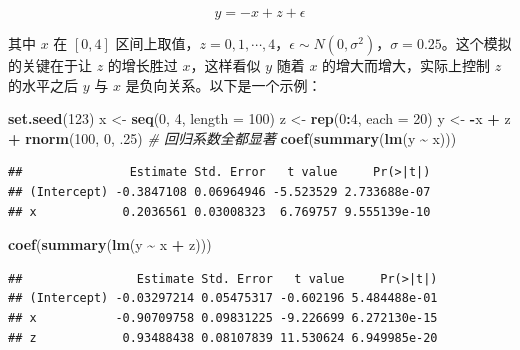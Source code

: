 \documentclass[
  b5paper,
  UTF8,twoside]{book}
\newenvironment{Shaded}{\begin{snugshade}}{\end{snugshade}}
\newcommand{\AttributeTok}[1]{\textcolor[rgb]{0.13,0.29,0.53}{#1}}
\newcommand{\CommentTok}[1]{\textcolor[rgb]{0.56,0.35,0.01}{\textit{#1}}}
\newcommand{\DecValTok}[1]{\textcolor[rgb]{0.00,0.00,0.81}{#1}}
\newcommand{\FunctionTok}[1]{\textcolor[rgb]{0.13,0.29,0.53}{\textbf{#1}}}
\newcommand{\NormalTok}[1]{#1}
\newcommand{\OtherTok}[1]{\textcolor[rgb]{0.56,0.35,0.01}{#1}}
\newcommand{\SpecialCharTok}[1]{\textcolor[rgb]{0.81,0.36,0.00}{\textbf{#1}}}
\begin{document}
\[y=-x+z+\epsilon\]

其中 \(x\) 在 \([0,4]\) 区间上取值，\(z=0,1,\cdots,4\)，\(\epsilon\sim N(0,\sigma^{2})\)，\(\sigma=0.25\)。这个模拟的关键在于让 \(z\) 的增长胜过 \(x\)，这样看似 \(y\) 随着 \(x\) 的增大而增大，实际上控制 \(z\) 的水平之后 \(y\) 与 \(x\) 是负向关系。以下是一个示例：

\begin{Shaded}
\begin{Highlighting}[]
\FunctionTok{set.seed}\NormalTok{(}\DecValTok{123}\NormalTok{)}
\NormalTok{x }\OtherTok{\textless{}{-}} \FunctionTok{seq}\NormalTok{(}\DecValTok{0}\NormalTok{, }\DecValTok{4}\NormalTok{, }\AttributeTok{length =} \DecValTok{100}\NormalTok{)}
\NormalTok{z }\OtherTok{\textless{}{-}} \FunctionTok{rep}\NormalTok{(}\DecValTok{0}\SpecialCharTok{:}\DecValTok{4}\NormalTok{, }\AttributeTok{each =} \DecValTok{20}\NormalTok{)}
\NormalTok{y }\OtherTok{\textless{}{-}} \SpecialCharTok{{-}}\NormalTok{x }\SpecialCharTok{+}\NormalTok{ z }\SpecialCharTok{+} \FunctionTok{rnorm}\NormalTok{(}\DecValTok{100}\NormalTok{, }\DecValTok{0}\NormalTok{, .}\DecValTok{25}\NormalTok{)}
\CommentTok{\# 回归系数全都显著}
\FunctionTok{coef}\NormalTok{(}\FunctionTok{summary}\NormalTok{(}\FunctionTok{lm}\NormalTok{(y }\SpecialCharTok{\textasciitilde{}}\NormalTok{ x)))}
\end{Highlighting}
\end{Shaded}

\begin{verbatim}
##               Estimate Std. Error   t value     Pr(>|t|)
## (Intercept) -0.3847108 0.06964946 -5.523529 2.733688e-07
## x            0.2036561 0.03008323  6.769757 9.555139e-10
\end{verbatim}

\begin{Shaded}
\begin{Highlighting}[]
\FunctionTok{coef}\NormalTok{(}\FunctionTok{summary}\NormalTok{(}\FunctionTok{lm}\NormalTok{(y }\SpecialCharTok{\textasciitilde{}}\NormalTok{ x }\SpecialCharTok{+}\NormalTok{ z)))}
\end{Highlighting}
\end{Shaded}

\begin{verbatim}
##                Estimate Std. Error   t value     Pr(>|t|)
## (Intercept) -0.03297214 0.05475317 -0.602196 5.484488e-01
## x           -0.90709758 0.09831225 -9.226699 6.272130e-15
## z            0.93488438 0.08107839 11.530624 6.949985e-20
\end{verbatim}
\end{document}
